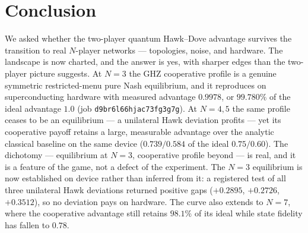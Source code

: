\documentclass[conference]{IEEEtran}
\begin{document}
\section{Conclusion}\label{sec:conclusion}
We asked whether the two-player quantum Hawk--Dove advantage survives the
transition to real $N$-player networks --- topologies, noise, and hardware.
The landscape is now charted, and the answer is yes, with sharper edges than
the two-player picture suggests. At $N{=}3$ the GHZ cooperative profile is a
genuine symmetric restricted-menu pure Nash equilibrium, and it reproduces on
superconducting hardware with measured advantage $0.9978$, or $99.780\%$ of
the ideal advantage $1.0$ (job \texttt{d9br6l66hjac73fg3g7g}).
At $N{=}4,5$ the same profile ceases to be an equilibrium --- a unilateral
Hawk deviation profits --- yet its cooperative payoff retains a large,
measurable advantage over the analytic classical baseline on the same device
($0.739 / 0.584$ of the ideal $0.75 / 0.60$).
The dichotomy --- equilibrium at $N{=}3$, cooperative profile beyond --- is
real, and it is a feature of the game, not a defect of the experiment. The
$N{=}3$ equilibrium is now established on device rather than inferred from it:
a registered test of all three unilateral Hawk deviations returned positive
gaps ($+0.2895$, $+0.2726$, $+0.3512$), so no deviation pays on hardware.
The curve also extends to $N{=}7$, where the cooperative advantage still
retains $98.1\%$ of its ideal while state fidelity has fallen to $0.78$.
\end{document}
